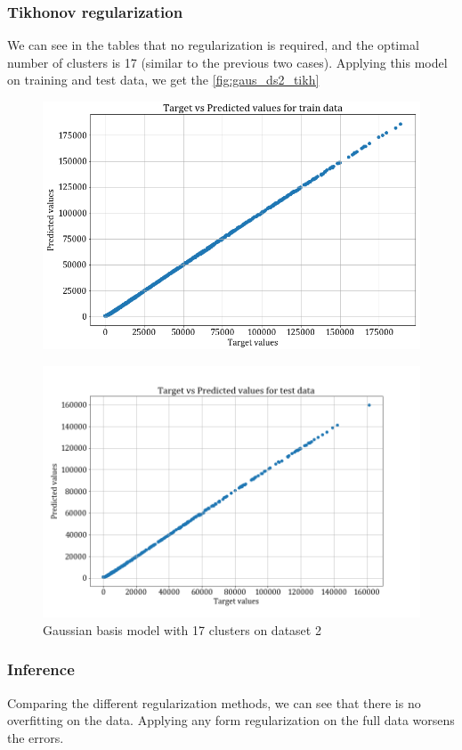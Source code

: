\documentclass[12pt,a4paper]{article}
\begin{document}
\subsubsection{Tikhonov regularization}
We can see in the tables that no regularization is required, and the optimal number of clusters is 17 (similar to the previous two cases).
Applying this model on training and test data, we get the \autoref{fig:gaus_ds2_tikh}
\begin{figure}[H]
    \centering
    \includegraphics[scale=0.5]{images/train_ds2_tikhreg.png}
\end{figure}
\begin{figure}[H]
    \centering
    \includegraphics[scale=0.5]{images/test_ds2_tikhreg.png}
    \caption{Gaussian basis model with 17 clusters on dataset 2}
    \label{fig:gaus_ds2_tikh}
\end{figure}

\subsubsection{Inference}
Comparing the different regularization methods, we can see that there is no overfitting on the data. Applying any form regularization on the full data worsens the errors. \\
\end{document}
